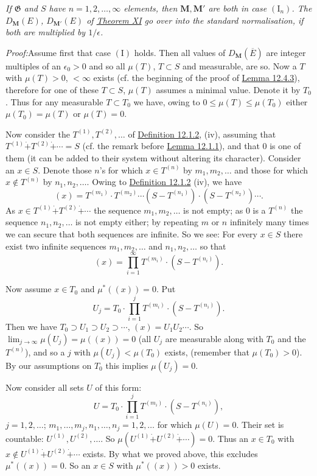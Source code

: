 \documentclass[12pt,b5paper,twoside]{article}
\newcommand{\M}{\mathbf M}
\newcommand{\Proof}{\par\noindent\textit{Proof:}\enspace}
\newcommand{\defref}[1]{\hyperref[def:#1]{Definition #1}}
\newcommand{\lemref}[1]{\hyperref[lem:#1]{Lemma #1}}
\newcommand{\thmref}[1]{\hyperref[thm:#1]{Theorem #1}}
\begin{document}
\emph{If $\mathfrak G$ and $S$ have $n=1,2,\ldots,\infty$ elements, then
$\M,\M'$ are both in case $(\mathrm I_n)$. The $D_\M(E)$, $D_{\M'}(E)$ of
\thmref{XI} go over into the standard normalisation, if both are multiplied by
$1/\epsilon$.}

\Proof Assume first that case $(\mathrm I)$ holds. Then all values of
$D_\M(\overline E)$ are integer multiples of an $\epsilon_0>0$ and so all
$\mu(T)$, $T\subset S$ and measurable, are so. Now a $T$ with
$\mu(T)>0$, $<\infty$ exists (cf. the beginning of the proof of
\lemref{12.4.3}), therefore for one of these $T\subset S$, $\mu(T)$ assumes a
minimal value. Denote it by $T_0$. Thus for any measurable $T\subset T_0$ we
have, owing to $0\leq\mu(T)\leq\mu(T_0)$ either
$\mu(T_0)=\mu(T)$ or $\mu(T)=0$.

Now consider the $T^{(1)},T^{(2)},\ldots$ of \defref{12.1.2}, (iv), assuming
that $T^{(1)}\mathbin{\dot+}T^{(2)}\mathbin{\dot+}\cdots=S$ (cf. the remark
before \lemref{12.1.1}), and that $0$ is one of them (it can be added to their
system without altering its character). Consider an $x\in S$. Denote those
$n$'s for which $x\in T^{(n)}$ by $m_1,m_2,\ldots$ and those for which
$x\notin T^{(n)}$ by $n_1,n_2,\ldots$. Owing to \defref{12.1.2} (iv), we
have
\[
 (x)=T^{(m_1)}\cdot T^{(m_2)}\cdots
 (S-T^{(n_1)})\cdot(S-T^{(n_2)})\cdots.
\]
As $x\in T^{(1)}\mathbin{\dot+}T^{(2)}\mathbin{\dot+}\cdots$ the sequence
$m_1,m_2,\ldots$ is not empty; as $0$ is a $T^{(n)}$ the sequence
$n_1,n_2,\ldots$ is not empty either; by repeating $m$ or $n$ infinitely many
times we can secure that both sequences are infinite. So we see: For every
$x\in S$ there exist two infinite sequences $m_1,m_2,\ldots$ and
$n_1,n_2,\ldots$ so that
\[
 (x)=\prod_{i=1}^\infty T^{(m_i)}\cdot(S-T^{(n_i)}).
\]

Now assume $x\in T_0$ and $\mu^*((x))=0$. Put
\[
 U_j=T_0\cdot\prod_{i=1}^jT^{(m_i)}\cdot(S-T^{(n_i)}).
\]
Then we have $T_0\supset U_1\supset U_2\supset\cdots$,
$(x)=U_1U_2\cdots$. So $\lim_{j\to\infty}\mu(U_j)=\mu((x))=0$ (all $U_j$
are measurable along with $T_0$ and the $T^{(n)}$), and so a $j$ with
$\mu(U_j)<\mu(T_0)$ exists, (remember that $\mu(T_0)>0$). By our assumptions
on $T_0$ this implies $\mu(U_j)=0$.

Now consider all sets $U$ of this form:
\[
 U=T_0\cdot\prod_{i=1}^jT^{(m_i)}\cdot(S-T^{(n_i)}),
\]
$j=1,2,\ldots$; $m_1,\ldots,m_j,n_1,\ldots,n_j=1,2,\ldots$ for which
$\mu(U)=0$. Their set is countable: $U^{(1)},U^{(2)},\ldots$. So
$\mu(U^{(1)}\mathbin{\dot+}U^{(2)}\mathbin{\dot+}\cdots)=0$. Thus an
$x\in T_0$ with
$x\notin U^{(1)}\mathbin{\dot+}U^{(2)}\mathbin{\dot+}\cdots$ exists. By what
we proved above, this excludes $\mu^*((x))=0$. So an $x\in S$ with
$\mu^*((x))>0$ exists.
\end{document}
